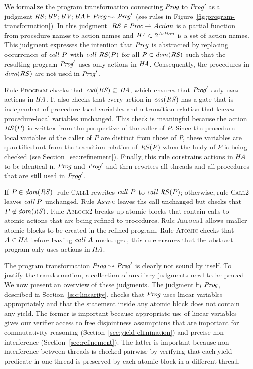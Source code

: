 We formalize the program transformation connecting $\mathit{Prog}$ to $Prog'$ as a judgment
$\mathit{RS};\mathit{HP};\mathit{HV};\mathit{HA} \vdash \mathit{Prog} \leadsto \mathit{Prog}'$ (see rules in Figure~\ref{fig:program-transformation}).
In this judgment,
$\mathit{RS} \in \mathit{Proc} \rightharpoonup \mathit{Action}$ is a partial function from procedure names to action names
and $\mathit{HA} \in 2^{\mathit{Action}}$ is a set of action names.
This judgment expresses the intention that $\mathit{Prog}$ is abstracted by replacing
occurrences of $\mathit{call}\ P$ with $\mathit{call}\ \mathit{RS}(P)$ for all $P \in \mathit{dom}(\mathit{RS})$ such that 
the resulting program $\mathit{Prog}'$ uses only actions in $\mathit{HA}$.
Consequently, the procedures in $\mathit{dom}(\mathit{RS})$ are not used in $\mathit{Prog}'$.

Rule \textsc{Program} checks that $\mathit{cod}(\mathit{RS}) \subseteq \mathit{HA}$,
which ensures that $\mathit{Prog}'$ only uses actions in $\mathit{HA}$.
It also checks that every action in $\mathit{cod}(\mathit{RS})$ has a gate 
that is independent of procedure-local variables and a transition relation that leaves 
procedure-local variables unchanged.  
This check is meaningful because the action $\mathit{RS}(P)$ is written from the 
perspective of the caller of $P$.
Since the procedure-local variables of the caller of $P$ are distinct from those of $P$,
these variables are quantified out from the transition relation of $\mathit{RS}(P)$ when 
the body of $P$ is being checked (see Section~\ref{sec:refinement}).
Finally, this rule constrains actions in $\mathit{HA}$ to be identical in $\mathit{Prog}$ and $\mathit{Prog}'$ and then rewrites all threads
and all procedures that are still used in $\mathit{Prog}'$.

If $P \in \mathit{dom}(\mathit{RS})$, rule \textsc{Call1} rewrites $\mathit{call}\ P$ to $\mathit{call}\ \mathit{RS}(P)$;
otherwise, rule \textsc{Call2} leaves $\mathit{call}\ P$ unchanged.
Rule \textsc{Async} leaves the call unchanged but checks that $P \not \in \mathit{dom}(\mathit{RS})$.
Rule \textsc{Ablock2} breaks up atomic blocks that contain calls
to atomic actions that are being refined to procedures.
Rule \textsc{Ablock1} allows smaller atomic blocks to be created in the refined program.
Rule \textsc{Atomic} checks that $A \in \mathit{HA}$ before leaving $\mathit{call}\ A$ unchanged;
this rule ensures that the abstract program only uses actions in $\mathit{HA}$.

The program transformation $\mathit{Prog} \leadsto \mathit{Prog}'$ is clearly not sound by itself.
To justify the transformation, a collection of auxiliary judgments need to be proved.
We now present an overview of these judgments.
The judgment $\vdash_l \mathit{Prog}$, described in Section~\ref{sec:linearity}, 
checks that $\mathit{Prog}$ uses linear variables appropriately and that the statement
inside any atomic block does not contain any yield.
The former is important because appropriate use of linear variables gives our verifier access to free disjointness
assumptions that are important for commutativity reasoning (Section~\ref{sec:yield-elimination})
and precise non-interference (Section~\ref{sec:refinement}).
The latter is important because non-interference between threads is checked pairwise by verifying that each yield predicate
in one thread is preserved by each atomic block in a different thread.

